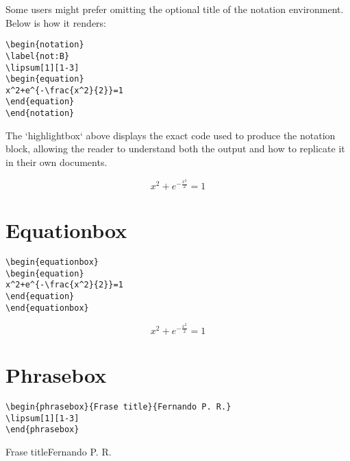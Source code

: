 Some users might prefer omitting the optional title of the notation environment. Below is how it renders:
\begin{highlightbox}
\begin{verbatim}
\begin{notation}
\label{not:B}
\lipsum[1][1-3]
\begin{equation}
x^2+e^{-\frac{x^2}{2}}=1
\end{equation}
\end{notation}
\end{verbatim}
\end{highlightbox}
The `highlightbox` above displays the exact code used to produce the notation block, allowing the reader to understand both the output and how to replicate it in their own documents.

\begin{notation}
\label{not:B}
\lipsum[1][1-3]
\begin{equation}
x^2+e^{-\frac{x^2}{2}}=1
\end{equation}
\end{notation}





\section{Equationbox}

\begin{highlightbox}
\begin{verbatim}
\begin{equationbox}
\begin{equation}
x^2+e^{-\frac{x^2}{2}}=1
\end{equation}
\end{equationbox}
\end{verbatim}
\end{highlightbox}
\begin{equationbox}
\begin{equation}
x^2+e^{-\frac{x^2}{2}}=1
\end{equation}
\end{equationbox}


\section{Phrasebox}
\begin{highlightbox}
\begin{verbatim}
\begin{phrasebox}{Frase title}{Fernando P. R.}
\lipsum[1][1-3]
\end{phrasebox}
\end{verbatim}
\end{highlightbox}
\begin{phrasebox}{Frase title}{Fernando P. R.}
\lipsum[1][1-3]
\end{phrasebox}


